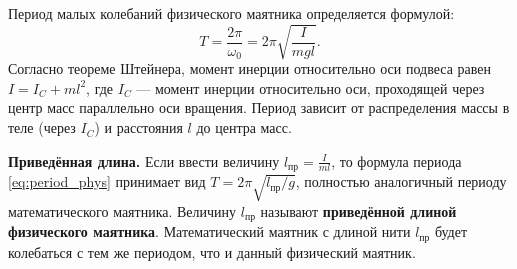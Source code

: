 \begin{property}
Период малых колебаний физического маятника определяется формулой:
\begin{equation}
    T = \frac{2\pi}{\omega_0} = 2\pi \sqrt{\frac{I}{mgl}}. \label{eq:period_phys}
\end{equation}
Согласно теореме Штейнера, момент инерции относительно оси подвеса равен $I = I_C + ml^2$, где $I_C$ --- момент инерции относительно оси, проходящей через центр масс параллельно оси вращения. Период зависит от распределения массы в теле (через $I_C$) и расстояния $l$ до центра масс.
\end{property}

\begin{remark}
\textbf{Приведённая длина.} Если ввести величину $l_{\text{пр}} = \frac{I}{ml}$, то формула периода \eqref{eq:period_phys} принимает вид $T = 2\pi \sqrt{l_{\text{пр}}/g}$, полностью аналогичный периоду математического маятника. Величину $l_{\text{пр}}$ называют \textbf{приведённой длиной физического маятника}. Математический маятник с длиной нити $l_{\text{пр}}$ будет колебаться с тем же периодом, что и данный физический маятник.
\end{remark}

